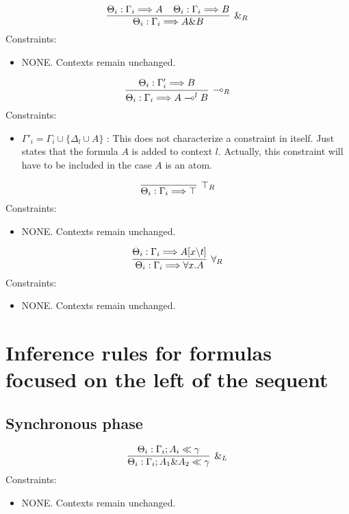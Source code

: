 \documentclass[a4paper, 11pt]{article}
\begin{document}
$$
\infer[\&_R]{\Theta_i : \Gamma_i \Longrightarrow A \& B}
{
    \Theta_i : \Gamma_i \Longrightarrow A \;\;\;\;
    \Theta_i : \Gamma_i \Longrightarrow B
}
$$
Constraints:
\begin{itemize}
    \item NONE. Contexts remain unchanged.
\end{itemize}

$$
\infer[\multimap_R]{\Theta_i : \Gamma_i \Longrightarrow A \multimap^l B}
{
    \Theta_i : \Gamma'_i \Longrightarrow B
}
$$
Constraints:
\begin{itemize}
    \item $\Gamma'_i = \Gamma_i \cup \{\Delta_l \cup A\}$ : This does not
    characterize a constraint in itself. Just states that the formula $A$ is
    added to context $l$. Actually, this constraint will have to be included in
    the case $A$ is an atom.
\end{itemize}

$$
\infer[\top_R]{\Theta_i : \Gamma_i \Longrightarrow \top}{}
$$
Constraints:
\begin{itemize}
    \item NONE. Contexts remain unchanged.
\end{itemize}

$$
\infer[\forall_R]{\Theta_i : \Gamma_i \Longrightarrow \forall x. A}
{
    \Theta_i : \Gamma_i \Longrightarrow A [x \backslash t]
}
$$
Constraints:
\begin{itemize}
    \item NONE. Contexts remain unchanged.
\end{itemize}

\section*{Inference rules for formulas focused on the left of the sequent}

\subsection*{Synchronous phase}

$$
\infer[\&_L]{\Theta_i : \Gamma_i ; A_1 \& A_2 \ll \gamma}
{
    \Theta_i : \Gamma_i ; A_i \ll \gamma
}
$$
Constraints:
\begin{itemize}
    \item NONE. Contexts remain unchanged.
\end{itemize}
\end{document}
